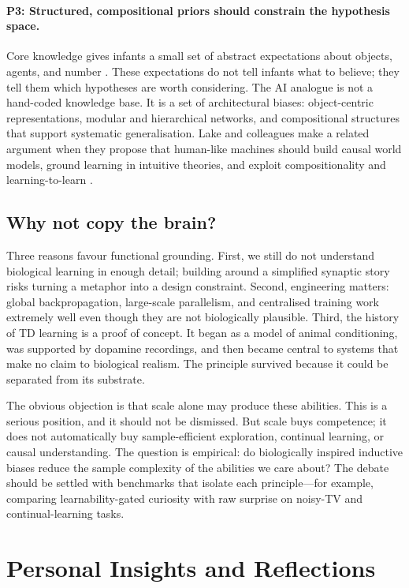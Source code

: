 \documentclass{article}
\begin{document}
\paragraph{P3: Structured, compositional priors should constrain the hypothesis space.}
Core knowledge gives infants a small set of abstract expectations about objects, agents,
and number \citep{spelke2007core}. These expectations do not tell infants what to believe;
they tell them which hypotheses are worth considering. The AI analogue is not a hand-coded
knowledge base. It is a set of architectural biases: object-centric representations,
modular and hierarchical networks, and compositional structures that support systematic
generalisation. Lake and colleagues make a related argument when they propose that
human-like machines should build causal world models, ground learning in intuitive
theories, and exploit compositionality and learning-to-learn \citep{lake2017building}.

\subsection{Why not copy the brain?}

Three reasons favour functional grounding. First, we still do not understand biological
learning in enough detail; building around a simplified synaptic story risks turning a
metaphor into a design constraint. Second, engineering matters: global backpropagation,
large-scale parallelism, and centralised training work extremely well even though they are
not biologically plausible. Third, the history of TD learning is a proof of concept. It
began as a model of animal conditioning, was supported by dopamine recordings, and then
became central to systems that make no claim to biological realism. The principle survived
because it could be separated from its substrate.

The obvious objection is that scale alone may produce these abilities. This is a serious
position, and it should not be dismissed. But scale buys competence; it does not
automatically buy sample-efficient exploration, continual learning, or causal
understanding. The question is empirical: do biologically inspired inductive biases
reduce the sample complexity of the abilities we care about? The debate should be settled
with benchmarks that isolate each principle---for example, comparing learnability-gated
curiosity with raw surprise on noisy-TV and continual-learning tasks.

\section{Personal Insights and Reflections}\label{sec:reflection}
\end{document}
